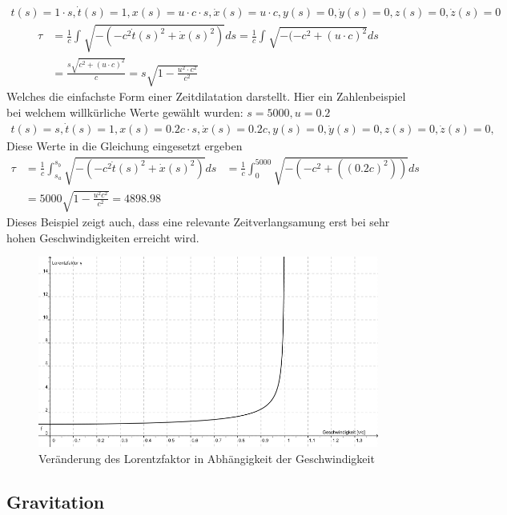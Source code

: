 \begin{refsection}
\begin{align*}
     t(s)=1\cdot s, \dot{t}(s)=1,
 	 x(s)=u\cdot c \cdot s, \dot{x}(s)=u\cdot c,
     y(s)=0, \dot{y}(s)=0,
     z(s)=0, \dot{z}(s)=0
\end{align*}
\begin{align*}
    \tau
    &=
    \frac{1}{c}\int_{}^{}\sqrt{-(-c^2\dot{t}(s)^2+\dot{x}(s)^2)}ds 
    =
    \frac{1}{c}\int_{}^{}\sqrt{-(-c^2 +(u\cdot c)^{2}}ds\\
    &=
    \frac{s\sqrt{c^2+(u\cdot c)^{2}}}{c} 
    =
    s\sqrt{1-\frac{u^2\cdot c^2}{c^2}}
\end{align*}
Welches die einfachste Form einer Zeitdilatation darstellt.
Hier ein Zahlenbeispiel bei welchem willkürliche Werte gew\"ahlt wurden:
$s=5000, u=0.2$ 
\begin{align*}
    t(s)=s, \dot{t}(s)=1,
    x(s)=0.2c \cdot s, \dot{x}(s)=0.2c,
    y(s)=0, \dot{y}(s)=0,
    z(s)=0, \dot{z}(s)=0,
\end{align*}
Diese Werte in die Gleichung eingesetzt ergeben
\begin{align*}
    \tau
    &=
    \frac{1}{c}\int_{s_{a}}^{s_{b}}\sqrt{-(-c^2\dot{t}(s)^2+\dot{x}(s)^2)}ds
    &=
    \frac{1}{c}\int_{0}^{5000}\sqrt{-(-c^2+((0.2c)^2))}ds\\
    &=
    5000\sqrt{1-\frac{u^2 c^2}{c^2}} = 4898.98
\end{align*}
Dieses Beispiel zeigt auch, dass eine relevante Zeitverlangsamung erst bei sehr hohen Geschwindigkeiten erreicht wird.
\begin{figure}[H]
    \centering
    \includegraphics[width=\hsize]{zeitreisen/Lorentzfaktor.jpg}
    \caption{Ver\"anderung des Lorentzfaktor in Abh\"angigkeit der Geschwindigkeit%
        \label{skript:geodaten:fig:transport}}
\end{figure}
\subsection{Gravitation}


\end{refsection}
